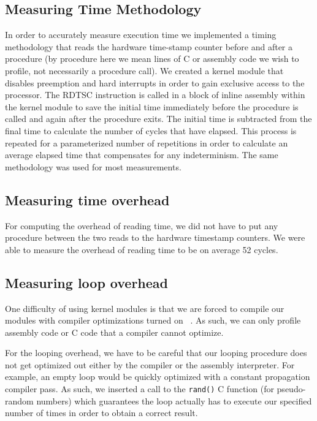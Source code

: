 \subsection{Measuring Time Methodology}

In order to accurately measure execution time we implemented a timing methodology that reads the 
hardware time-stamp counter before and after a procedure (by procedure here we mean lines of C or assembly code we wish to profile, not necessarily a procedure call). We created a kernel module that disables 
preemption and hard interrupts in order to gain exclusive access to the processor. The RDTSC 
instruction is called in a block of inline assembly within the kernel module to save the 
initial time immediately before the procedure is called and again after the procedure exits. The initial time is subtracted from the final time to calculate the number of cycles that have elapsed. This process
is repeated for a parameterized number of repetitions in order to calculate an average elapsed time that 
compensates for any indeterminism. The same methodology was used for most measurements.

\subsection{Measuring time overhead}

For computing the overhead of reading time, we did not have to put any procedure between the two reads to the hardware timestamp counters. We were able to measure the overhead of reading time to be on average 52 cycles. 

\subsection{Measuring loop overhead}

One difficulty of using kernel modules is that we are forced to compile our modules with compiler optimizations turned on ~\cite{linux}. As such, we can only profile assembly code or C code that a compiler cannot optimize.

For the looping overhead,  we have to be careful that our looping procedure does not get optimized out either by the compiler or the assembly interpreter. For example, an empty loop would be quickly optimized with a constant propagation compiler pass. As such, we inserted a call to the \texttt{rand()} C function (for pseudo-random numbers) which guarantees the loop actually has to execute our specified number of times in order to obtain a correct result. 

